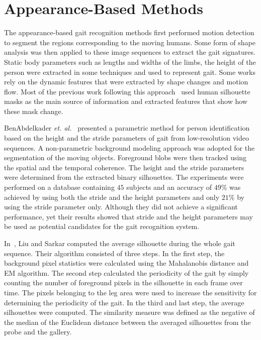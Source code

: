 \section{Appearance-Based Methods} \label{sec:appearance_based_methods}
The appearance-based gait recognition methods first performed motion detection to segment the regions corresponding to the moving humans. Some form of shape analysis was then applied to these image sequences to extract the gait signatures. Static body parameters such as lengths and widths of the limbs, the height of the person were extracted in some techniques and used to represent gait. Some works rely on the dynamic features that were extracted by shape changes and motion flow. Most of the previous work following this approach~\cite{Benabdelkader_02, Liu_04, Han_06, Bashir_09, Lam_11} used human silhouette masks as the main source of information and extracted features that show how these mask change. 

BenAbdelkader \textit{et. al.}~\cite{Benabdelkader_02} presented a parametric method for person identification based on the height and the stride parameters of gait from low-resolution video sequences. A non-parametric background modeling approach was adopted for the segmentation of the moving objects. Foreground blobs were then tracked using the spatial and the temporal coherence. The height and the stride parameters were determined from the extracted binary silhouettes. The experiments were performed on a database containing $ 45 $ subjects and an accuracy of $ 49\% $ was achieved by using both the stride and the height parameters and only $21\%$ by using the stride parameter only. Although they did not achieve a significant performance, yet their results showed that stride and the  height parameters may be used as potential candidates for the gait recognition system.

In~\cite{Liu_04}, Liu and Sarkar computed the average silhouette during the whole gait sequence. Their algorithm consisted of three steps. In the first step, the background pixel statistics were calculated using the Mahalanobis distance and EM algorithm. The second step calculated the periodicity of the gait by simply counting the number of foreground pixels in the silhouette in each frame over time. The pixels belonging to the leg area were used to increase the sensitivity for determining the periodicity of the gait. In the third and last step, the average silhouettes were computed. The similarity measure was defined as the negative of the median of the Euclidean distance between the averaged silhouettes from the probe and the gallery.

